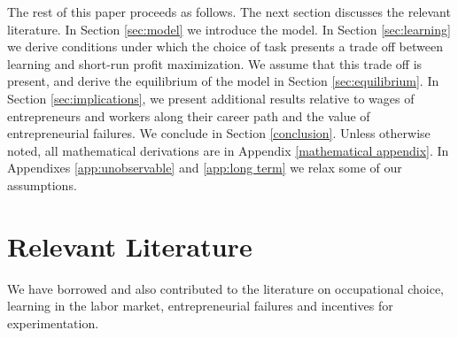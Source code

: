 \documentclass[12pt,american]{paper}
\theoremstyle{remark}
\begin{document}


The rest of this paper proceeds as follows. The next section discusses the relevant literature.
In Section \ref{sec:model} we introduce the model. In Section \ref{sec:learning} we derive conditions under which the choice of task presents a trade off between learning and short-run profit maximization. We assume that this trade off is present, and derive the equilibrium of the model in Section \ref{sec:equilibrium}.  In Section \ref{sec:implications}, we present additional results relative to wages of entrepreneurs and workers along their career path and the value of entrepreneurial failures. We conclude in Section \ref{conclusion}. Unless otherwise noted, all mathematical derivations are in Appendix \ref{mathematical appendix}. In  Appendixes \ref{app:unobservable} and \ref{app:long term} we relax some of our assumptions. 

\section{Relevant Literature}

We have borrowed and also contributed to the literature on occupational choice, learning in the labor market, entrepreneurial failures and incentives for experimentation.

\end{document}
